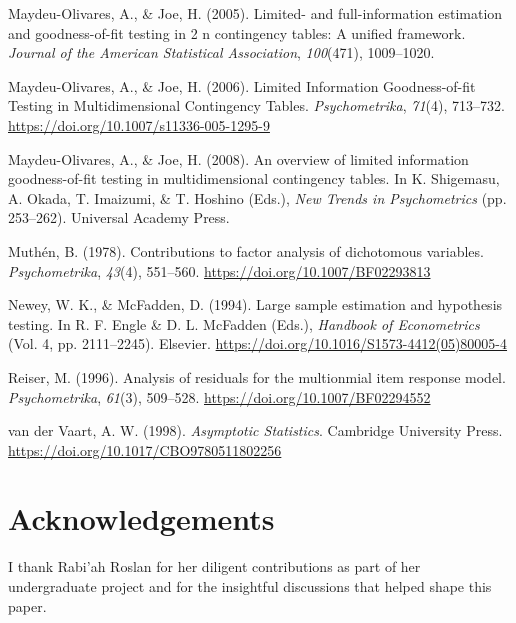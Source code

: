 \documentclass[
  letterpaper,
  DIV=11,
  numbers=noendperiod]{scrartcl}
\newlength{\cslhangindent}
\newenvironment{CSLReferences}[2] %
 {\begin{list}{}{%
  \setlength{\itemindent}{0pt}
  \setlength{\leftmargin}{0pt}
  \setlength{\parsep}{0pt}
  \ifodd #1
   \setlength{\leftmargin}{\cslhangindent}
   \setlength{\itemindent}{-1\cslhangindent}
  \fi
  \setlength{\itemsep}{#2\baselineskip}}}
 {\end{list}}
\begin{document}
\begin{CSLReferences}{1}{0}
Maydeu-Olivares, A., \& Joe, H. (2005). Limited- and full-information
estimation and goodness-of-fit testing in 2 n contingency tables: {A}
unified framework. \emph{Journal of the American Statistical
Association}, \emph{100}(471), 1009--1020.

Maydeu-Olivares, A., \& Joe, H. (2006). Limited {Information
Goodness-of-fit Testing} in {Multidimensional Contingency Tables}.
\emph{Psychometrika}, \emph{71}(4), 713--732.
\url{https://doi.org/10.1007/s11336-005-1295-9}

Maydeu-Olivares, A., \& Joe, H. (2008). An overview of limited
information goodness-of-fit testing in multidimensional contingency
tables. In K. Shigemasu, A. Okada, T. Imaizumi, \& T. Hoshino (Eds.),
\emph{New {Trends} in {Psychometrics}} (pp. 253--262). Universal Academy
Press.

Muthén, B. (1978). Contributions to factor analysis of dichotomous
variables. \emph{Psychometrika}, \emph{43}(4), 551--560.
\url{https://doi.org/10.1007/BF02293813}

Newey, W. K., \& McFadden, D. (1994). Large sample estimation and
hypothesis testing. In R. F. Engle \& D. L. McFadden (Eds.),
\emph{Handbook of {Econometrics}} (Vol. 4, pp. 2111--2245). Elsevier.
\url{https://doi.org/10.1016/S1573-4412(05)80005-4}

Reiser, M. (1996). Analysis of residuals for the multionmial item
response model. \emph{Psychometrika}, \emph{61}(3), 509--528.
\url{https://doi.org/10.1007/BF02294552}

van der Vaart, A. W. (1998). \emph{Asymptotic {Statistics}}. Cambridge
University Press. \url{https://doi.org/10.1017/CBO9780511802256}

\end{CSLReferences}

\section*{Acknowledgements}\label{acknowledgements}

I thank Rabi'ah Roslan for her diligent contributions as part of her
undergraduate project and for the insightful discussions that helped
shape this paper.
\end{document}
